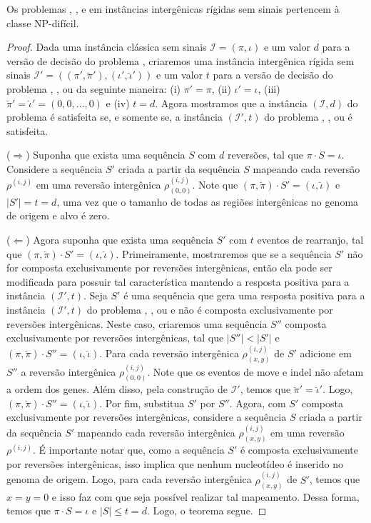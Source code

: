 \begin{theorem}\label{theorem:YARJETHG}
Os problemas \SbIR{}, \SbIRI{}, \SbIRM{} e \SbIRMI{} em instâncias intergênicas rígidas sem sinais pertencem à classe NP-difícil.
\end{theorem}
\begin{proof}
Dada uma instância clássica sem sinais $\mathcal{I}=(\pi,\iota)$ e um valor $d$ para a versão de decisão do problema \SbR, criaremos uma instância intergênica rígida sem sinais $\mathcal{I'}=((\pi',\breve\pi'),(\iota',\breve\iota'))$ e um valor $t$ para a versão de decisão do problema \SbIR{}, \SbIRI{}, \SbIRM{} ou \SbIRMI{} da seguinte maneira: (i) $\pi' = \pi$, (ii) $\iota' = \iota$, (iii) $\breve\pi' = \breve\iota' = (0,0,\dots,0)$ e (iv) $t = d$. Agora mostramos que a instância $(\mathcal{I},d)$ do problema \SbR{} é satisfeita se, e somente se, a instância $(\mathcal{I'},t)$ do problema \SbIR{}, \SbIRI{}, \SbIRM{} ou \SbIRMI{} é satisfeita.

($\Rightarrow$) Suponha que exista uma sequência $S$ com $d$ reversões, tal que $\pi \cdot S = \iota$. Considere a sequência $S'$ criada a partir da sequência $S$ mapeando cada reversão $\rho^{(i,j)}$ em uma reversão intergênica $\rho^{(i,j)}_{(0,0)}$. Note que $(\pi,\breve\pi) \cdot S' = (\iota,\breve\iota)$ e $|S'| = t = d$, uma vez que o tamanho de todas as regiões intergênicas no genoma de origem e alvo é zero.

($\Leftarrow$) Agora suponha que exista uma sequência $S'$ com $t$ eventos de rearranjo, tal que $(\pi,\breve\pi) \cdot S' = (\iota,\breve\iota)$. Primeiramente, mostraremos que se a sequência $S'$ não for composta exclusivamente por reversões intergênicas, então ela pode ser modificada para possuir tal característica mantendo a resposta positiva para a instância $(\mathcal{I'},t)$. Seja $S'$ é uma sequência que gera uma resposta positiva para a instância $(\mathcal{I'},t)$ do problema \SbIR{}, \SbIRI{}, \SbIRM{} ou \SbIRMI{} e não é composta exclusivamente por reversões intergênicas. Neste caso, criaremos uma sequência $S''$ composta exclusivamente por reversões intergênicas, tal que  $|S''| < |S'|$ e $(\pi,\breve\pi) \cdot S'' = (\iota,\breve\iota)$. Para cada reversão intergênica $\rho^{(i,j)}_{(x,y)}$ de $S'$ adicione em $S''$ a reversão intergênica $\rho^{(i,j)}_{(0,0)}$. Note que os eventos de move e indel não afetam a ordem dos genes. Além disso, pela construção de $\mathcal{I'}$, temos que $\breve\pi' = \breve\iota'$. Logo, $(\pi,\breve\pi) \cdot S'' = (\iota,\breve\iota)$. Por fim, substitua $S'$ por $S''$. Agora, com $S'$ composta exclusivamente por reversões intergênicas, considere a sequência $S$ criada a partir da sequência $S'$ mapeando cada reversão intergênica $\rho^{(i,j)}_{(x,y)}$ em uma reversão $\rho^{(i,j)}$. É importante notar que, como a sequência $S'$ é composta exclusivamente por reversões intergênicas, isso implica que nenhum nucleotídeo é inserido no genoma de origem. Logo, para cada reversão intergênica $\rho^{(i,j)}_{(x,y)}$ de $S'$, temos que $x=y=0$ e isso faz com que seja possível realizar tal mapeamento. Dessa forma, temos que $\pi \cdot S = \iota$ e $|S| \le t = d $. Logo, o teorema segue.
\end{proof}

